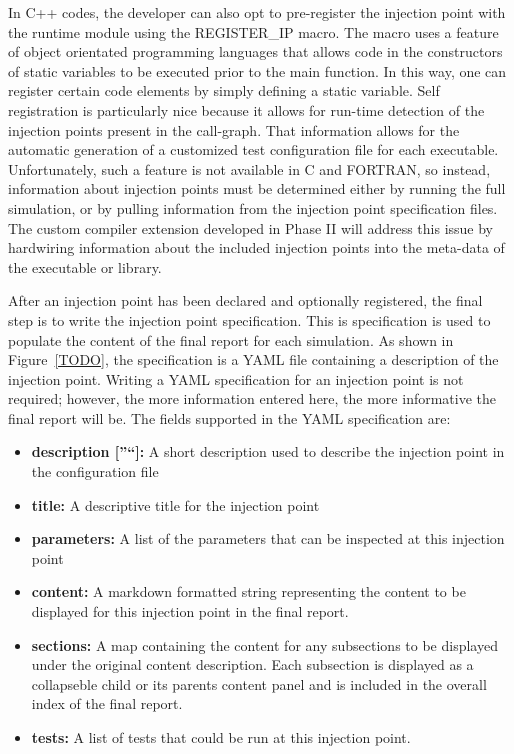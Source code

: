 In C++ codes, the developer can also opt to pre-register the injection point with the runtime module using the REGISTER\_IP macro. The macro uses a feature of object orientated programming languages that allows code in the constructors of static variables to be executed prior to the main function. In this way, one can register certain code elements by simply defining a static variable. Self registration is particularly nice because it allows for run-time detection of the injection points present in the call-graph. That information allows for the automatic generation of a customized test configuration file for each executable. Unfortunately, such a feature is not available in C and FORTRAN, so instead, information about injection points must be determined either by running the full simulation, or by pulling information from the injection point specification files. The custom compiler extension developed in Phase II will address this issue by hardwiring information about the included injection points into the meta-data of the executable or library. 

After an injection point has been declared and optionally registered, the final step is to write the injection point specification. This is specification
is used to populate the content of the final \VV report for each simulation. As shown in Figure~\ref{TODO}, the specification is a YAML file containing a description of the injection point. Writing a YAML specification 
for an injection point is not required; however, the more information entered here, the more informative the final report will be. The fields supported in the YAML specification are:

\begin{itemize}
 \item {\bf description [''``]:} A short description used to describe the injection point in the configuration file
 \item {\bf title:} A descriptive title for the injection point 
 \item {\bf parameters:} A list of the parameters that can be inspected at this injection point
 \item {\bf content:} A markdown formatted string representing the content to be displayed for this injection point in the final report.
 \item {\bf sections:} A map containing the content for any subsections to be displayed under the original content description. Each subsection is displayed
 as a collapseble child or its parents content panel and is included in the overall index of the final report. 
 \item {\bf tests:} A list of tests that could be run at this injection point. 
\end{itemize}

